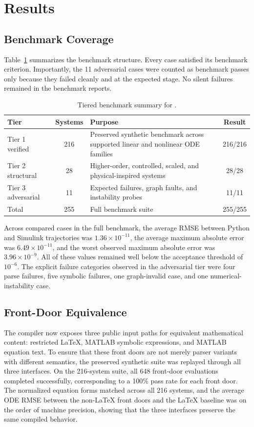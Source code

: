 \documentclass[colorlinks,upint,subscriptcorrection,varvw,balance,nofoot]{asmeconf}
\begin{document}
\section{Results}
\subsection{Benchmark Coverage}
Table~\ref{tab:tiers} summarizes the benchmark structure. Every case satisfied its benchmark criterion. Importantly, the 11 adversarial cases were counted as benchmark passes only because they failed cleanly and at the expected stage. No silent failures remained in the benchmark reports.

\begin{table}[t]
\caption{Tiered benchmark summary for .}
\label{tab:tiers}
\centering
\begin{tabularx}{\columnwidth}{@{}l c X c@{}}
\toprule
Tier & Systems & Purpose & Result \\
\midrule
Tier 1 verified & 216 & Preserved synthetic benchmark across supported linear and nonlinear ODE families & 216/216 \\
Tier 2 structural & 28 & Higher-order, controlled, scaled, and physical-inspired systems & 28/28 \\
Tier 3 adversarial & 11 & Expected failures, graph faults, and instability probes & 11/11 \\
\midrule
Total & 255 & Full benchmark suite & 255/255 \\
\bottomrule
\end{tabularx}
\end{table}

Across compared cases in the full benchmark, the average RMSE between Python and Simulink trajectories was $1.36\times10^{-11}$, the average maximum absolute error was $6.49\times10^{-11}$, and the worst observed maximum absolute error was $3.96\times10^{-9}$. All of these values remained well below the acceptance threshold of $10^{-6}$. The explicit failure categories observed in the adversarial tier were four parse failures, five symbolic failures, one graph-invalid case, and one numerical-instability case.

\subsection{Front-Door Equivalence}
The compiler now exposes three public input paths for equivalent mathematical content: restricted \LaTeX{}, MATLAB symbolic expressions, and MATLAB equation text. To ensure that these front doors are not merely parser variants with different semantics, the preserved synthetic suite was replayed through all three interfaces. On the 216-system suite, all 648 front-door evaluations completed successfully, corresponding to a 100\% pass rate for each front door. The normalized equation forms matched across all 216 systems, and the average ODE RMSE between the non-\LaTeX{} front doors and the \LaTeX{} baseline was on the order of machine precision, showing that the three interfaces preserve the same compiled behavior.
\end{document}
